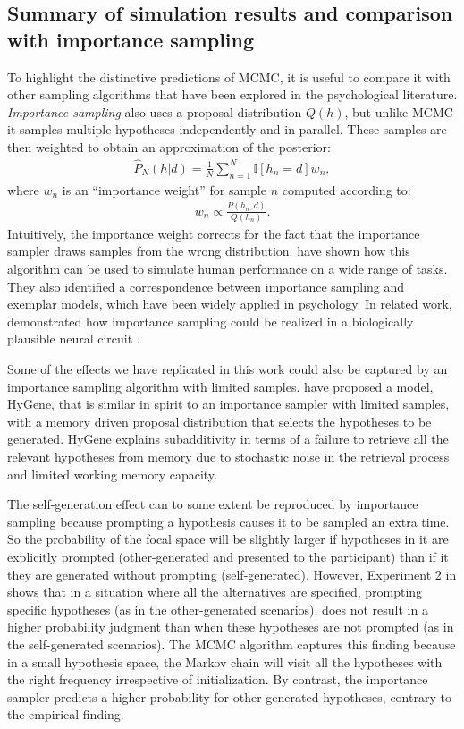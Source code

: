 \subsection{Summary of simulation results and comparison with importance sampling}

To highlight the distinctive predictions of MCMC, it is useful to compare it with other sampling algorithms that have been explored in the psychological literature. \emph{Importance sampling} also uses a proposal distribution $Q(h)$, but unlike MCMC it samples multiple hypotheses independently and in parallel. These samples are then weighted to obtain an approximation of the posterior:
\begin{align}
\hat{P}_N(h|d) = \frac{1}{N} \sum_{n=1}^N \mathbb{I}[h_n=d] w_n,
\end{align}
where $w_n$ is an ``importance weight'' for sample $n$ computed according to:
\begin{align}
w_n \propto \frac{P(h_n,d)}{Q(h_n)}.
\end{align}
Intuitively, the importance weight corrects for the fact that the importance sampler draws samples from the wrong distribution. \citet{shi10} have shown how this algorithm can be used to simulate human performance on a wide range of tasks. They also identified a correspondence between importance sampling and exemplar models, which have been widely applied in psychology. In related work, \citet{shi2009neural} demonstrated how importance sampling could be realized in a biologically plausible neural circuit \citep[see also][]{abbott13}.

Some of the effects we have replicated in this work could also be captured by an importance sampling algorithm with limited samples. \citet{Thomas2008} have proposed a model, HyGene, that is similar in spirit to an importance sampler with limited samples, with a memory driven proposal distribution that selects the hypotheses to be generated. HyGene explains subadditivity in terms of a failure to retrieve all the relevant hypotheses from memory due to stochastic noise in the retrieval process and limited working memory capacity.

The self-generation effect can to some extent be reproduced by importance sampling because prompting a hypothesis causes it to be sampled an extra time. So the probability of the focal space will be slightly larger if hypotheses in it are explicitly prompted (other-generated and presented to the participant) than if it they are generated without prompting (self-generated). However, Experiment 2 in \cite{conf} shows that in a situation where all the alternatives are specified, prompting specific hypotheses (as in the other-generated scenarios), does not result in a higher probability judgment than when these hypotheses are not prompted (as in the self-generated scenarios). The MCMC algorithm captures this finding because in a small hypothesis space, the Markov chain will visit all the hypotheses with the right frequency irrespective of initialization. By contrast, the importance sampler predicts a higher probability for other-generated hypotheses, contrary to the empirical finding.

